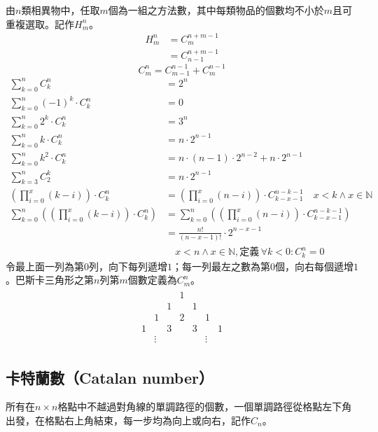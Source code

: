 \documentclass[a4paper,12pt]{report}
\begin{document}
由$n$類相異物中，任取$m$個為一組之方法數，其中每類物品的個數均不小於$m$且可重複選取。記作$H^n_m$。
\[
\begin{aligned}
H_m^n &= C^{n+m-1}_m \\
&= C^{n+m-1}_{n-1}
\end{aligned}
\]
\[C^n_m=C^{n-1}_{m-1}+C^{n-1}_m\]
\[
\begin{aligned}
\sum_{k=0}^n C_k^n &= 2^n \\
\sum_{k=0}^n (-1)^k \cdot C_k^n &= 0 \\
\sum_{k=0}^n 2^k \cdot C_k^n &= 3^n \\
\sum_{k=0}^n k \cdot C_k^n &= n \cdot 2^{n-1} \\
\sum_{k=0}^n k^2 \cdot C_k^n &= n \cdot (n-1) \cdot 2^{n-2} + n \cdot 2^{n-1} \\
\sum_{k=3}^n C_2^k &= n \cdot 2^{n-1} \\
\left(\prod_{i=0}^x (k-i)\right) \cdot C^n_k &= \left(\prod_{i=0}^x (n-i)\right) \cdot C^{n-k-1}_{k-x-1} \quad x < k\land x \in \mathbb{N} \\
\sum_{k=0}^{n} \left(\left(\prod_{i=0}^x (k-i)\right) \cdot C^n_k\right) &= \sum_{k=0}^{n} \left(\left(\prod_{i=0}^x (n-i)\right) \cdot C^{n-k-1}_{k-x-1}\right) \\
&= \frac{n!}{\left(n-x-1\right)!} \cdot 2^{n-x-1} \\
& \quad x < n\land x \in \mathbb{N}, \text{定義}\,\forall k<0: C_k^n=0
\end{aligned}
\]
令最上面一列為第$0$列，向下每列遞增$1$；每一列最左之數為第$0$個，向右每個遞增$1$。巴斯卡三角形之第$n$列第$m$個數定義為$C_m^n$。
\[
\begin{aligned}
\begin{array}{ccccccc}
& & & 1 & & & \\
& & 1 & & 1 & & \\
& 1 & & 2 & & 1 & \\
1 & & 3 & & 3 & & 1 \\
& \vdots & & & & \vdots &
\end{array}
\end{aligned}
\]
\subsection{卡特蘭數（Catalan number）}
所有在$n \times n$格點中不越過對角線的單調路徑的個數，一個單調路徑從格點左下角出發，在格點右上角結束，每一步均為向上或向右，記作$C_n$。
\end{document}
